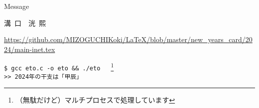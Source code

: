 \documentclass[twocolumn,fontsize=9pt]{jlreq}
\begin{document}
\begin{itembox}[l]{Message}
\end{itembox}
\begin{framed}
    \vspace{.2cm}
    \begin{center}
        {\LARGE 溝\ 口\ \  洸\ 熙}
    \end{center}
\end{framed}
\noindent\tiny{\url{https://github.com/MIZOGUCHIKoki/LaTeX/blob/master/new_years_card/2024/main-inet.tex}}
\newpage

\small{\texttt{\$ gcc eto.c -o eto \&\& ./eto }\ \ \footnote{（無駄だけど）マルチプロセスで処理しています}\\
    \texttt{>> 2024年の干支は「甲辰」}}
\end{document}
